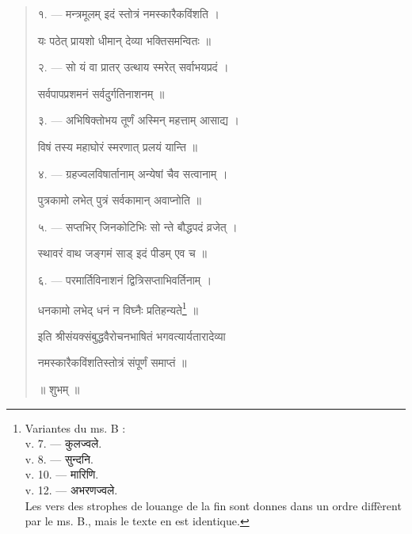 \documentclass[a4paper, 11pt, oneside, french, landscape, twocolumn]{article}
\begin{document}
\begin{quotation}
\bigskip

\texthindi{१}. --- \texthindi{मन्त्रमूलम् इदं स्तोत्रं नमस्कारैकविंशति ।}

\texthindi{यः पठेत् प्रायशो धीमान् देव्या भक्तिसमन्वितः ॥}

\bigskip

\texthindi{२}. --- \texthindi{सो यं वा प्रातर् उत्थाय स्मरेत् सर्वाभयप्रदं ।}

\texthindi{सर्वपापप्रशमनं सर्वदुर्गतिनाशनम् ॥}

\bigskip

\texthindi{३}. --- \texthindi{अभिषिक्तोभय तूर्णं अस्मिन् महत्ताम् आसाद्य ।}

\texthindi{विषं तस्य महाघोरं स्मरणात् प्रलयं यान्ति ॥}

\bigskip

\texthindi{४}. --- \texthindi{ग्रहज्वलविषार्तानाम् अन्येषां चैव सत्वानाम् ।}

\texthindi{पुत्रकामो लभेत् पुत्रं सर्वकामान् अवाप्नोति ॥}

\bigskip

\texthindi{५}. --- \texthindi{सप्तभिर् जिनकोटिभिः सो न्ते बौद्धपदं व्रजेत् ।}

\texthindi{स्थावरं वाथ जङ्गमं साड् इदं पीडम् एव च ॥}

\bigskip

\texthindi{६}. --- \texthindi{परमार्तिविनाशनं द्वित्रिसप्ताभिवर्तिनाम् ।}

\texthindi{धनकामो लभेद् धनं न विघ्नैः प्रतिहन्यते}\footnote{Variantes du ms. B :\\\hspace*{10mm}v. 7. --- \texthindi{कुलज्वले}.\\\hspace*{10mm}v. 8. --- \texthindi{सुन्दनि}.\\\hspace*{10mm}v. 10. --- \texthindi{मारिणि}.\\\hspace*{10mm}v. 12. --- \texthindi{अभरणज्वले}.\\\hspace*{5mm}Les vers des strophes de louange de la fin sont donnes dans un ordre diffèrent par le ms. B., mais le texte en est identique.} \texthindi{॥}

\bigskip

\texthindi{इति श्रीसंयक्संबुद्धवैरोचनभाषितं भगवत्यार्यतारादेव्या}

\texthindi{नमस्कारैकविंशतिस्तोत्रं संपूर्णं समाप्तं ॥}

\bigskip

\texthindi{॥ शुभम् ॥}
\end{quotation}
\clearpage
\end{document}
